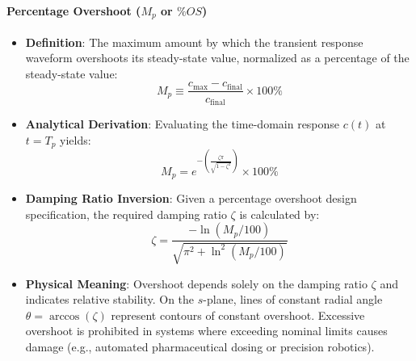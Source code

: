 \documentclass[12pt,onecolumn,twoside ]{article}
\begin{document}
	\paragraph{Percentage Overshoot ($M_p$ or $\%OS$)}
	\begin{itemize}
		\item
		\textbf{Definition}: The maximum amount by which the transient response waveform overshoots its steady-state value, normalized as a percentage of the steady-state value: \[
		M_p \equiv \frac{c_{\text{max}} - c_{\text{final}}}{c_{\text{final}}} \times 100\%
		\]
		\item
		\textbf{Analytical Derivation}: Evaluating the time-domain response $c(t)$ at $t = T_p$ yields: \[
		M_p = e^{-( \frac{\zeta \pi}{\sqrt{1 - \zeta^2}} )} \times 100\%
		\]
		\item
		\textbf{Damping Ratio Inversion}: Given a percentage overshoot design specification, the required damping ratio $\zeta$ is calculated by: \[
		\zeta = \frac{-\ln(M_p / 100)}{\sqrt{\pi^2 + \ln^2(M_p / 100)}}
		\]
		\item
		\textbf{Physical Meaning}: Overshoot depends solely on the damping ratio $\zeta$ and indicates relative stability. On the $s$-plane, lines of constant radial angle $\theta = \arccos(\zeta)$ represent contours of constant overshoot. Excessive overshoot is prohibited in systems where exceeding nominal limits causes damage (e.g., automated pharmaceutical dosing or precision robotics).
	\end{itemize}
\end{document}
